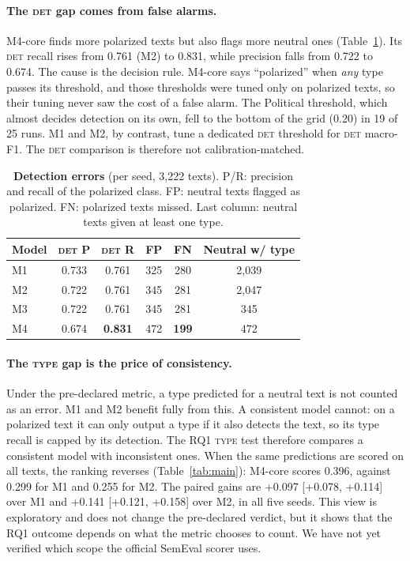 \documentclass[11pt]{article}
\newcommand{\DET}{\textsc{det}}
\newcommand{\TYPE}{\textsc{type}}
\begin{document}
\paragraph{The \DET{} gap comes from false alarms.}
M4-core finds more polarized texts but also flags more neutral ones
(Table~\ref{tab:det}). Its \DET{} recall rises from 0.761 (M2) to 0.831,
while precision falls from 0.722 to 0.674. The cause is the decision rule.
M4-core says ``polarized'' when \emph{any} type passes its threshold, and
those thresholds were tuned only on polarized texts, so their tuning never
saw the cost of a false alarm. The Political threshold, which almost decides
detection on its own, fell to the bottom of the grid (0.20) in 19 of 25
runs. M1 and M2, by contrast, tune a dedicated \DET{} threshold for \DET{}
macro-F1. The \DET{} comparison is therefore not calibration-matched.

\begin{table}[t]
\centering\small
\setlength{\tabcolsep}{4pt}
\begin{tabular}{@{}lccccc@{}}
\toprule
Model & \DET{} P & \DET{} R & FP & FN & Neutral w/ type \\
\midrule
M1 & 0.733 & 0.761 & 325 & 280 & 2{,}039 \\
M2 & 0.722 & 0.761 & 345 & 281 & 2{,}047 \\
M3 & 0.722 & 0.761 & 345 & 281 & 345 \\
M4 & 0.674 & \textbf{0.831} & 472 & \textbf{199} & 472 \\
\bottomrule
\end{tabular}
\caption{\textbf{Detection errors} (per seed, 3{,}222 texts). P/R: precision
and recall of the polarized class. FP: neutral texts flagged as polarized.
FN: polarized texts missed. Last column: neutral texts given at least one
type.}
\label{tab:det}
\end{table}

\paragraph{The \TYPE{} gap is the price of consistency.}
Under the pre-declared metric, a type predicted for a neutral text is not
counted as an error. M1 and M2 benefit fully from this. A consistent model
cannot: on a polarized text it can only output a type if it also detects
the text, so its type recall is capped by its detection. The RQ1 \TYPE{}
test therefore compares a consistent model with inconsistent ones. When the
same predictions are scored on all texts, the ranking reverses
(Table~\ref{tab:main}): M4-core scores 0.396, against 0.299 for M1 and 0.255
for M2. The paired gains are +0.097 [+0.078, +0.114] over M1 and +0.141
[+0.121, +0.158] over M2, in all five seeds. This view is exploratory and
does not change the pre-declared verdict, but it shows that the RQ1 outcome
depends on what the metric chooses to count. We have not yet verified which
scope the official SemEval scorer uses.
\end{document}

